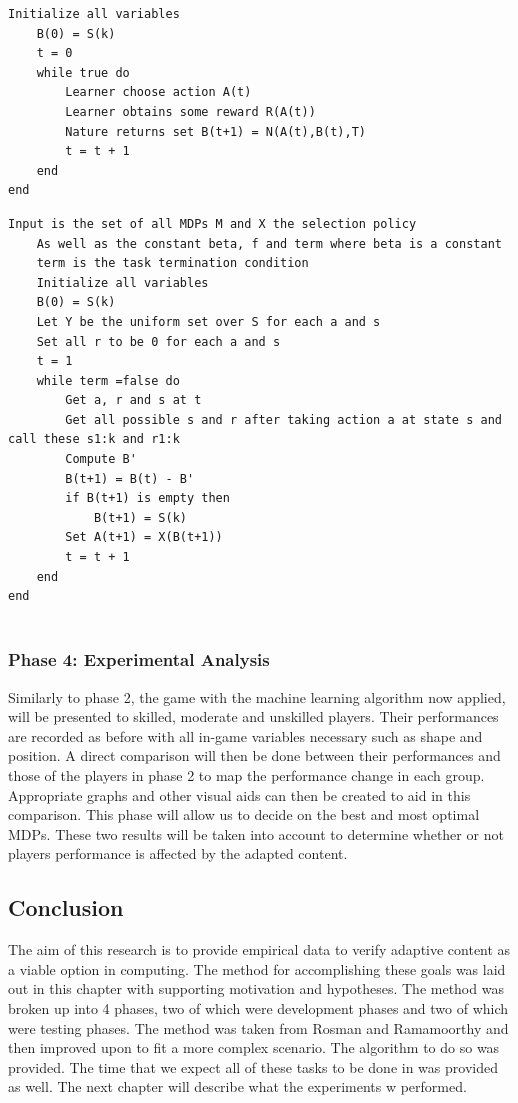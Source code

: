 \documentclass[11pt]{article}
\begin{document}
\begin{lstlisting}[label=Algorithm,caption=Algorithm 1: MDP update]
	Initialize all variables
	B(0) = S(k)
	t = 0
	while true do
		Learner choose action A(t)
		Learner obtains some reward R(A(t))
		Nature returns set B(t+1) = N(A(t),B(t),T)
		t = t + 1
	end
end
\end{lstlisting}
\begin{lstlisting}[label=Algorithm,caption=Algorithm 2: Online Interact]
	Input is the set of all MDPs M and X the selection policy
	As well as the constant beta, f and term where beta is a constant
	term is the task termination condition
	Initialize all variables
	B(0) = S(k)
	Let Y be the uniform set over S for each a and s
	Set all r to be 0 for each a and s
	t = 1
	while term =false do
		Get a, r and s at t
		Get all possible s and r after taking action a at state s and call these s1:k and r1:k
		Compute B'
		B(t+1) = B(t) - B'
		if B(t+1) is empty then
			B(t+1) = S(k)
		Set A(t+1) = X(B(t+1))
		t = t + 1
	end
end
	
\end{lstlisting}

\vspace{6.0 mm}
\subsubsection{Phase 4: Experimental Analysis}

Similarly to phase 2, the game with the machine learning algorithm now applied, will be presented to skilled, moderate and unskilled players. Their performances are recorded as before with all in-game variables necessary such as shape and position. A direct comparison will then be done between their performances and those of the players in phase 2 to map the performance change in each group. Appropriate graphs and other visual aids can then be created to aid in this comparison. This phase will allow us to decide on the best and most optimal MDPs. These two results will be taken into account to determine whether or not players performance is affected by the adapted content.

\clearpage


\subsection{Conclusion}
The aim of this research is to provide empirical data to verify adaptive content as a viable option in computing. The method for accomplishing these goals was laid out in this chapter with supporting motivation and hypotheses. The method was broken up into 4 phases, two of which were development phases and two of which were testing phases. The method was taken from Rosman and Ramamoorthy \citep{ramamoorthy2013latent} and then improved upon to fit a more complex scenario. The algorithm to do so was provided. The time that we expect all of these tasks to be done in was provided as well. The next chapter will describe what the experiments w performed.
\end{document}
